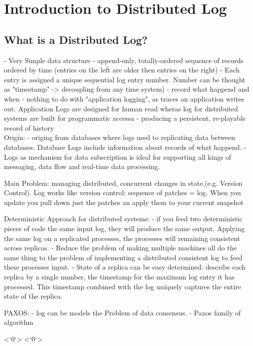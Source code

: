 \chapter{Introduction to Distributed Log}
\label{intro-log}
\section{What is a Distributed Log?}
- Very Simple data structure 
- append-only, totally-ordered sequence of records ordered by time (entries on
the left are older then entries on the right)
- Each entry is assigned a unique sequential log entry number. Number can be
thought as "timestamp" -> decoupling from any time system) 
- record what happend and when 
- nothing to do with "application logging", as traces an application writes
out. Application Logs are designed for human read wheras log for distributed
systems are built for programmatic accessa
- producing a persistent, re-playable record of history
\\
Origin:
- origing from databases where logs used to replicating data between databases.
Database Logs include information about records of what happend. 
- Logs as mechanism for data subscription is ideal for supporting all kings of
messaging, data flow and real-time data processing. 

Main Problem: managing distributed, concurrent changes in state.(e.g. Version
Control). Log works like version control: sequence of patches = log. When you
update you pull down just the patches an apply them to your current snapshot 

Deterministic Approach for distributed systems: 
- if you feed two deterministic pieces of code the same
input log, they will produce the same output. Applying the same log on a
replicated processes, the processes will remaining consistent across replicas. 
- Reduce the problem of making multiple machines all do the same thing to the
problem of implementing a distributed consistent log to feed these processes
input.
- State of a replica can be easy determined: describe each replica by a single
number, the timestamp for the maximum log entry it has processed. This timestamp
combined with the log uniquely captures the entire state of the replica. 

PAXOS: 
- log can be models the Problem of data consensus.  
- Paxos family of algorithm 

<`0`>
<`0`>
